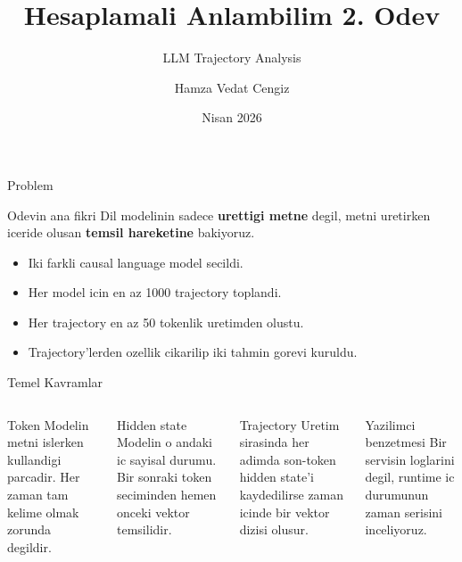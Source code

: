 \documentclass[aspectratio=169]{beamer}
\title{Hesaplamali Anlambilim 2. Odev}
\subtitle{LLM Trajectory Analysis}
\author{Hamza Vedat Cengiz}
\date{Nisan 2026}
\begin{document}
\begin{frame}
  \titlepage
\end{frame}

\begin{frame}{Problem}
  \begin{block}{Odevin ana fikri}
    Dil modelinin sadece \textbf{urettigi metne} degil, metni uretirken iceride olusan
    \textbf{temsil hareketine} bakiyoruz.
  \end{block}

  \vspace{0.4em}
  \begin{itemize}
    \item Iki farkli causal language model secildi.
    \item Her model icin en az 1000 trajectory toplandi.
    \item Her trajectory en az 50 tokenlik uretimden olustu.
    \item Trajectory'lerden ozellik cikarilip iki tahmin gorevi kuruldu.
  \end{itemize}
\end{frame}

\begin{frame}{Temel Kavramlar}
  \begin{columns}[T]
    \begin{block}{Token}
      Modelin metni islerken kullandigi parcadir. Her zaman tam kelime olmak zorunda degildir.
    \end{block}

    \begin{block}{Hidden state}
      Modelin o andaki ic sayisal durumu. Bir sonraki token seciminden hemen onceki vektor temsilidir.
    \end{block}

    \begin{block}{Trajectory}
      Uretim sirasinda her adimda son-token hidden state'i kaydedilirse zaman icinde bir vektor dizisi olusur.
    \end{block}

    \begin{block}{Yazilimci benzetmesi}
      Bir servisin loglarini degil, runtime ic durumunun zaman serisini inceliyoruz.
    \end{block}
  \end{columns}
\end{frame}
\end{document}
